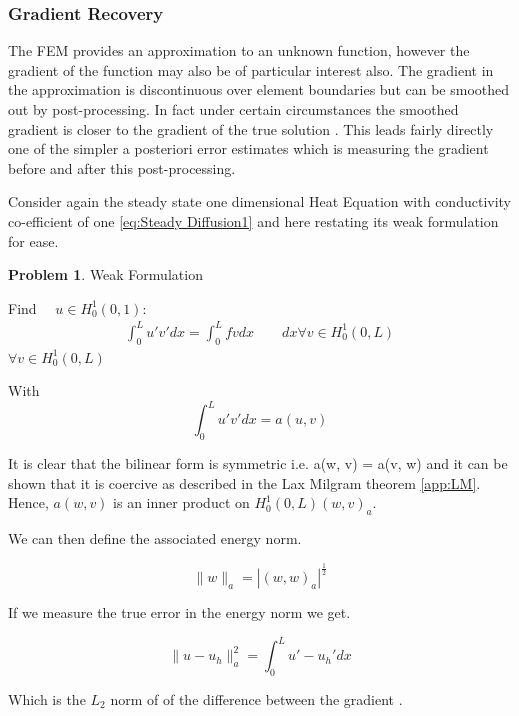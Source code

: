 \documentclass{uonmathreport}
\theoremstyle{definition}
\theoremstyle{problem}
\newtheorem{problem}{Problem}[section]
\theoremstyle{theorem}
\begin{document}
\subsubsection{Gradient Recovery} \label{subsubsec:KK}

The FEM provides an approximation to an unknown function, however the gradient of the function may also be of particular interest also. The gradient in the approximation is discontinuous over element boundaries but can be smoothed out by post-processing. In fact under certain circumstances the smoothed gradient is closer to the gradient of the true solution \cite{ainsworth65001posteriori}. This leads fairly directly one of the simpler a posteriori error estimates which is measuring the gradient before and after this post-processing.

Consider again the steady state one dimensional Heat Equation with conductivity co-efficient of one \ref{eq:Steady Diffusion1} and here restating its weak formulation for ease.

\begin{problem}{Weak Formulation}

Find $\quad u \in H^1_0(0, 1)$:
\begin{align*}
\int_0^L  u' v'  dx =   \int_0^L  f v dx  \quad \quad  dx \forall v \in H^1_0(0, L)
\end{align*}
$\forall v \in H^1_0(0, L)$
\end{problem}

With
\begin{equation*}
\int_0^L  u' v'  dx = a(u, v)  	
\end{equation*}

It is clear that the bilinear form is symmetric i.e.  a(w, v) = a(v, w) and it can be shown that it is coercive as described in the Lax Milgram theorem \ref{app:LM}. Hence, $a(w, v)$ is an inner product on $H^1_0(0, L) (w, v)_a$.

We can then define the associated energy norm.

\begin{equation}
\|w\|_a = |(w, w)_a|^\frac{1}{2}
\end{equation}

If we measure the true error in the energy norm we get.

\begin{equation}
\|u-u_h\|_a^2 = \int_0^L  u' - u_h'  dx
\end{equation}

Which is the $L_2$ norm of of the difference between the gradient .
\end{document}
